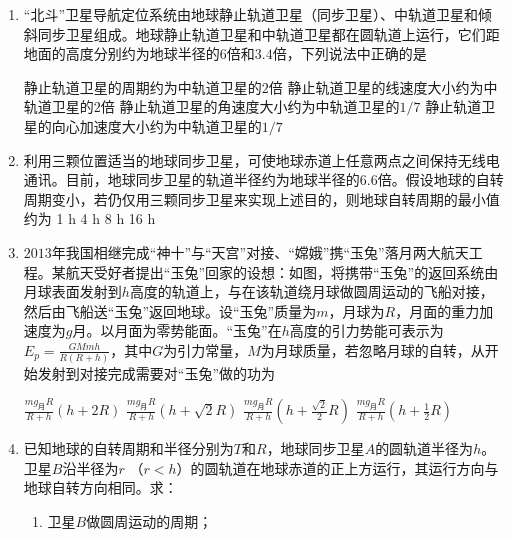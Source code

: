 \begin{enumerate}[leftmargin=0em]
\item 
{}
“北斗”卫星导航定位系统由地球静止轨道卫星（同步卫星）、中轨道卫星和倾斜同步卫星组成。地球静止轨道卫星和中轨道卫星都在圆轨道上运行，它们距地面的高度分别约为地球半径的$ 6 $倍和$ 3.4 $倍，下列说法中正确的是  

\fourchoices
{静止轨道卫星的周期约为中轨道卫星的$ 2 $倍}
{静止轨道卫星的线速度大小约为中轨道卫星的$ 2 $倍}
{静止轨道卫星的角速度大小约为中轨道卫星的$ 1/7 $}
{静止轨道卫星的向心加速度大小约为中轨道卫星的$ 1/7 $}



\item 
{}
利用三颗位置适当的地球同步卫星，可使地球赤道上任意两点之间保持无线电通讯。目前，地球同步卫星的轨道半径约为地球半径的$ 6.6 $倍。假设地球的自转周期变小，若仍仅用三颗同步卫星来实现上述目的，则地球自转周期的最小值约为  
\fourchoices
{1 h}
{4 h}
{8 h}
{16 h}



\item 
{}
$ 2013 $年我国相继完成“神十”与“天宫”对接、“嫦娥”携“玉兔”落月两大航天工程。某航天受好者提出“玉兔”回家的设想：如图，将携带“玉兔”的返回系统由月球表面发射到$ h $高度的轨道上，与在该轨道绕月球做圆周运动的飞船对接，然后由飞船送“玉兔”返回地球。设“玉兔”质量为$ m $，月球为$ R $，月面的重力加速度为$ g $月。以月面为零势能面。“玉兔”在$ h $高度的引力势能可表示为$E _ { p } = \frac { G M m h } { R ( R + h ) }$，其中$ G $为引力常量，$ M $为月球质量，若忽略月球的自转，从开始发射到对接完成需要对“玉兔”做的功为  
\begin{figure}[h!]
\centering

\end{figure}



\fourchoices
{$ \frac { m g _ { \text{月} } R } { R + h } ( h + 2 R ) $}
{$ \frac { m g _ { \text{月} } R} { R + h } ( h + \sqrt{2} R ) $}
{$ \frac { m g _ { \text{月} } R} { R + h } ( h + \frac{\sqrt{2}}{2} R ) $}
{$ \frac { m g _ { \text{月} } R} { R + h } ( h + \frac{ 1 }{ 2 } R ) $}



\item 
{}
已知地球的自转周期和半径分别为$ T $和$ R $，地球同步卫星$ A $的圆轨道半径为$ h $。 卫星$ B $沿半径为$ r $ （$ r < h $）的圆轨道在地球赤道的正上方运行，其运行方向与地球自转方向相同。求：
\begin{enumerate}
\renewcommand{\labelenumii}{(\arabic{enumii})}
\item 
卫星$ B $做圆周运动的周期；



\end{enumerate}
\end{enumerate}

